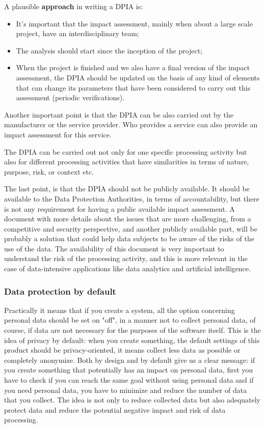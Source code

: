A plausible \textbf{approach} in writing a DPIA is:
\begin{itemize}
    \item It's important that the impact assessment, mainly when about a large scale project, have an interdisciplinary team;
    \item The analysis should start since the inception of the project;
    \item When the project is finished and we also have a final version of the impact assessment, the DPIA should be updated on the basis of any kind of elements that can change its parameters that have been considered to carry out this assessment (periodic verifications).
\end{itemize}

Another important point is that the DPIA can be also carried out by the manufacturer or the service provider. Who provides a service can also provide an impact assessment for this service.

The DPIA can be carried out not only for one specific processing activity but also for different processing activities that have similarities in terms of nature, purpose, risk, or context etc.

The last point, is that the DPIA should not be publicly available. It should be available to the Data Protection Authorities, in terms of accountability, but there is not any requirement for having a public available impact assessment.
A document with more details about the issues that are more challenging, from a
competitive and security perspective, and another publicly available part, will be probably a solution that could help data subjects to be aware of the risks of the use of the data. The availability of this document is very important to understand the risk of the processing activity, and this is more relevant in the case of data-intensive applications like data analytics and artificial intelligence.
\subsubsection{Data protection by default}
Practically it means that if you create a system, all the option concerning personal data should be set on "off", in a manner not to collect personal data, of course, if data are not necessary for the purposes of the software itself. This is the idea of privacy by default: when you create something, the default settings of this product should be privacy-oriented, it means collect less data as possible or completely anonymize.
Both by design and by default give us a clear message: if you create something that potentially has an impact on personal data, first you have to check if you can reach the same goal without using personal data and if you need personal data, you have to minimize and reduce the number of data that you collect. The idea is not only to reduce collected data but also adequately protect data and reduce the potential negative impact and risk of data processing.
